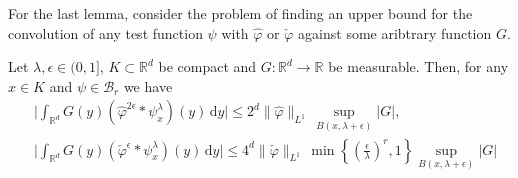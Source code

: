 For the last lemma, consider the problem of finding an upper bound for the convolution of any test function $\psi$ with $\hat \varphi$ or $\check \varphi$ against some aribtrary function $G$.   

\begin{lemma}\label{lemma:WALFANGER}
    Let $\lambda, \epsilon \in (0,1]$, $K \subset \mathbb{R}^d$ be compact and $G: \mathbb{R}^d \to \mathbb{R}$ be measurable. Then, for any $x \in K$ and $\psi \in \mathcal{B}_r$ we have 
    \begin{align} 
        &\Big| \int_{\mathbb{R}^d} G(y) \left( \hat \varphi^{2\epsilon} * \psi^\lambda_x \right) (y) \, \mathrm{d}y \Big| \leq 2^d \lVert \hat \varphi \rVert_{L^1} \, \sup_{B(x, \lambda + \epsilon)}|G|, \\
        &\Big| \int_{\mathbb{R}^d} G(y) \left( \check \varphi^{\epsilon} * \psi^\lambda_x \right) (y) \, \mathrm{d}y \Big| \leq 4^d \lVert \check \varphi \rVert_{L^1} \, \min\left\{ \left(\frac{\epsilon}{\lambda}\right)^r, 1 \right\}  \sup_{B(x, \lambda + \epsilon)}|G| \label{eq:WALFANGER}
    \end{align}  
\end{lemma}

